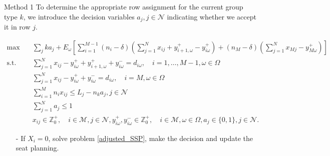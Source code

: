   \begin{frame}{Method 1}
    \scriptsize
    To determine the appropriate row assignment for the current group type $k$, we introduce the decision variables $a_j, j \in \mathcal{N}$ indicating whether we accept it in row $j$.
    
      \begin{tiny}
        \begin{equation}\label{adjusted_SSP}
        \begin{aligned}
        \max \quad & \sum_{j} k a_j + E_{\omega}\left[\sum_{i=1}^{M-1} (n_i-\delta) (\sum_{j= 1}^{N} x_{ij} + y_{i+1,\omega}^{+} - y_{i \omega}^{+}) + (n_{M}-\delta) (\sum_{j= 1}^{N} x_{Mj} - y_{M \omega}^{+})\right] \\
        \text {s.t.} \quad & \sum_{j= 1}^{N} x_{ij}-y_{i \omega}^{+}+
        y_{i+1, \omega}^{+} + y_{i \omega}^{-}=d_{i \omega}, \quad i = 1,\ldots,M-1, \omega \in \Omega \\
        & \sum_{j= 1}^{N} x_{ij} -y_{i \omega}^{+}+y_{i \omega}^{-}=d_{i \omega}, \quad i = M, \omega \in \Omega \\
        & \sum_{i=1}^{M} n_{i} x_{ij} \leq L_j - n_k a_j, j \in \mathcal{N} \\
        & \sum_{j=1}^{N} a_j \leq 1 \\
        & x_{ij} \in \mathbb{Z}_{0}^{+}, \quad i \in \mathcal{M}, j \in \mathcal{N}, y_{i \omega}^{+}, y_{i \omega}^{-} \in \mathbb{Z}_{0}^{+}, \quad i \in \mathcal{M}, \omega \in \Omega,  a_j \in \{0,1\}, j \in \mathcal{N}.
        \end{aligned}
      \end{equation}
    \end{tiny}
    \begin{itemize}      
      \item[-] If $X_i = 0$, solve problem \eqref{adjusted_SSP}, make the decision and update the seat planning.
    \end{itemize}
  \end{frame}

      
      
